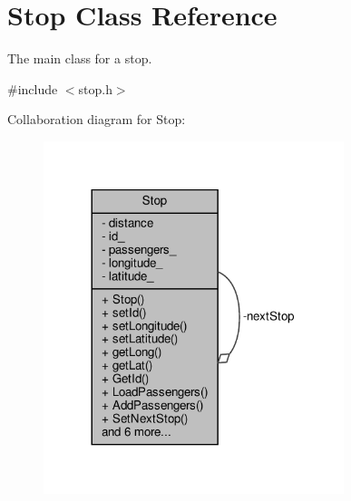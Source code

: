 \hypertarget{classStop}{}\section{Stop Class Reference}
\label{classStop}


The main class for a stop.  




{\ttfamily \#include $<$stop.\+h$>$}



Collaboration diagram for Stop\+:\nopagebreak
\begin{figure}[H]
\begin{center}
\leavevmode
\includegraphics[width=248pt]{classStop__coll__graph}
\end{center}
\end{figure}
